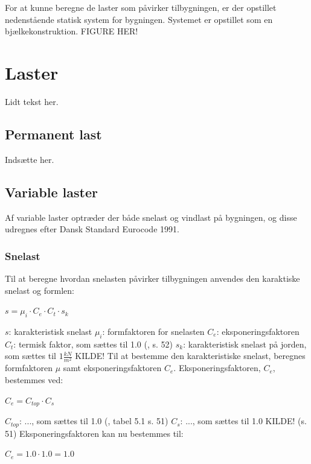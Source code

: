For at kunne beregne de laster som påvirker tilbygningen, er der opstillet nedenstående statisk system for bygningen. Systemet er opstillet som en bjælkekonstruktion.
\newline
\newline
FIGURE HER!

\section{Laster}
Lidt tekst her.

\subsection{Permanent last}
Indsætte her.

\subsection{Variable laster}
Af variable laster optræder der både snelast og vindlast på bygningen, og disse udregnes efter Dansk Standard Eurocode 1991.

\subsubsection{Snelast}
Til at beregne hvordan snelasten påvirker tilbygningen anvendes den karaktiske snelast og formlen:
\begin{center}
$s=\mu_i\cdot C_e\cdot C_t \cdot s_k$
\end{center}
$s$: karakteristisk snelast
\newline
$\mu_i$: formfaktoren for snelasten
\newline
$C_e$: eksponeringsfaktoren
\newline
$C_t$: termisk faktor, som sættes til 1.0 (\citep{EU91}, s. 52)
\newline
$s_k$: karakteristisk snelast på jorden, som sættes til $1 \frac{kN}{m^2}$ KILDE!
\newline
\newline
Til at bestemme den karakteristiske snelast, beregnes formfaktoren $\mu$ samt eksponeringsfaktoren $C_e$.
\newline
\newline
Eksponeringsfaktoren, $C_e$, bestemmes ved:
\begin{center}
$C_e=C_{top}\cdot C_s$
\end{center}
$C_{top}$: ..., som sættes til 1.0 (\citep{EU91}, tabel 5.1 s. 51)
\newline
$C_s$: ..., som sættes til 1.0 KILDE! (s. 51)
\newline
\newline
Eksponeringsfaktoren kan nu bestemmes til:
\begin{center}
$C_e=1.0\cdot 1.0=1.0$
\end{center}



